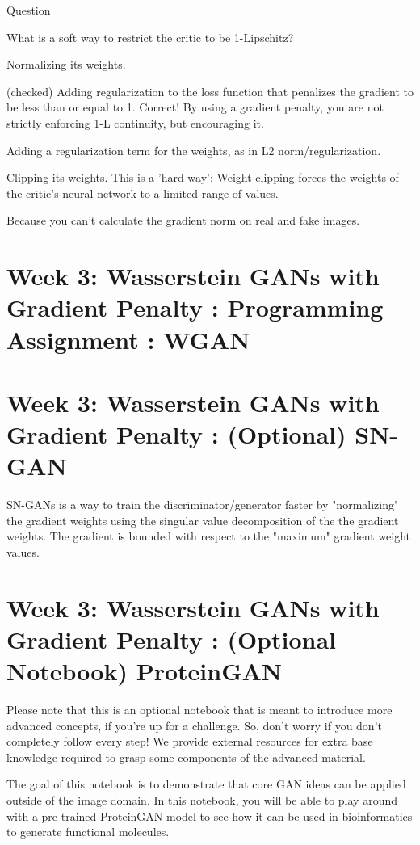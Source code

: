 \documentclass[11pt, onecolumn]{article}
\begin{document}
Question

What is a soft way to restrict the critic to be 1-Lipschitz?

Normalizing its weights.

(checked) Adding regularization to the loss function that penalizes the gradient to be less than or equal to 1.
Correct! By using a gradient penalty, you are not strictly enforcing 1-L continuity, but encouraging it.

Adding a regularization term for the weights, as in L2 norm/regularization.

Clipping its weights.
This is a 'hard way': Weight clipping forces the weights of the critic’s neural network to a limited range of values.

Because you can’t calculate the gradient norm on real and fake images.


\section{Week 3: Wasserstein GANs with Gradient Penalty : Programming Assignment : WGAN}


\section{Week 3: Wasserstein GANs with Gradient Penalty : (Optional) SN-GAN}

SN-GANs is a way to train the discriminator/generator faster by "normalizing" the gradient weights using the singular value decomposition of the the gradient weights. The gradient is bounded with respect to the "maximum" gradient weight values.


\section{Week 3: Wasserstein GANs with Gradient Penalty : (Optional Notebook) ProteinGAN}

Please note that this is an optional notebook that is meant to introduce more advanced concepts, if you're up for a challenge. So, don't worry if you don't completely follow every step! We provide external resources for extra base knowledge required to grasp some components of the advanced material.

The goal of this notebook is to demonstrate that core GAN ideas can be applied outside of the image domain. In this notebook, you will be able to play around with a pre-trained ProteinGAN model to see how it can be used in bioinformatics to generate functional molecules.
\end{document}
